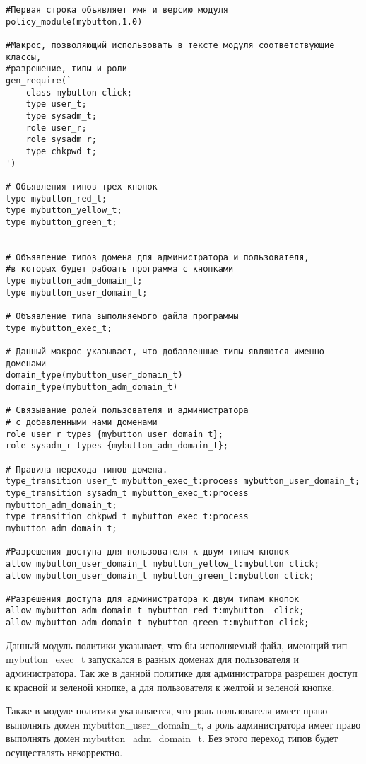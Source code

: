 \documentclass{./../class/UIR}
\begin{document}
\begin{verbatim}
#Первая строка объявляет имя и версию модуля
policy_module(mybutton,1.0)

#Макрос, позволяющий использовать в тексте модуля соответствующие классы,
#разрешение, типы и роли
gen_require(`
    class mybutton click;
    type user_t;
    type sysadm_t;
    role user_r;	
    role sysadm_r;
    type chkpwd_t;
')

# Объявления типов трех кнопок
type mybutton_red_t;
type mybutton_yellow_t;
type mybutton_green_t;


# Объявление типов домена для администратора и пользователя,
#в которых будет рабоать программа с кнопками
type mybutton_adm_domain_t;
type mybutton_user_domain_t;

# Объявление типа выполняемого файла программы
type mybutton_exec_t;

# Данный макрос указывает, что добавленные типы являются именно доменами
domain_type(mybutton_user_domain_t)
domain_type(mybutton_adm_domain_t)

# Связывание ролей пользователя и администратора
# с добавленными нами доменами
role user_r types {mybutton_user_domain_t};
role sysadm_r types {mybutton_adm_domain_t};

# Правила перехода типов домена.
type_transition user_t mybutton_exec_t:process mybutton_user_domain_t;
type_transition sysadm_t mybutton_exec_t:process mybutton_adm_domain_t;
type_transition chkpwd_t mybutton_exec_t:process mybutton_adm_domain_t;

#Разрешения доступа для пользователя к двум типам кнопок
allow mybutton_user_domain_t mybutton_yellow_t:mybutton click;
allow mybutton_user_domain_t mybutton_green_t:mybutton click;

#Разрешения доступа для администратора к двум типам кнопок
allow mybutton_adm_domain_t mybutton_red_t:mybutton  click; 
allow mybutton_adm_domain_t mybutton_green_t:mybutton click;

\end{verbatim}
	Данный модуль политики указывает, что бы исполняемый файл, имеющий тип
	mybutton\_exec\_t запускался в разных доменах для пользователя и
	администратора. Так же в данной политике для администратора разрешен доступ к
	красной и зеленой кнопке, а для пользователя к желтой и зеленой кнопке.
	
	Также в модуле политики указывается, что роль пользователя имеет право выполнять
	домен mybutton\_user\_domain\_t, а роль администратора имеет право выполнять
	домен mybutton\_adm\_domain\_t. Без этого переход типов будет осуществлять
	некорректно.
	
\end{document}
